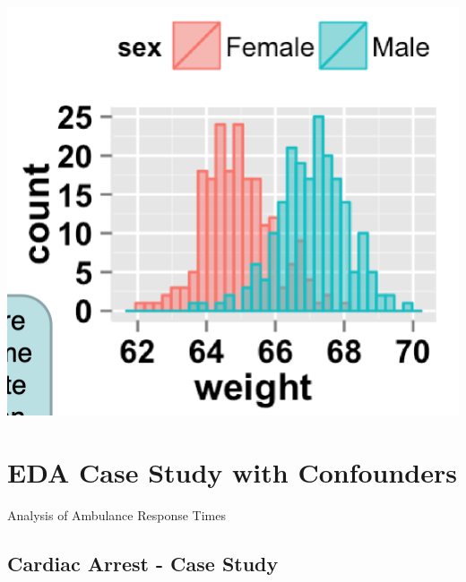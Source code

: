 \documentclass[11pt]{article}
\theoremstyle{definition}
\begin{document}
\includegraphics[width=\textwidth/4]{33.png}



\section{EDA Case Study with
Confounders}
Analysis of
Ambulance Response Times

\subsection{Cardiac Arrest - Case Study}
\end{document}
